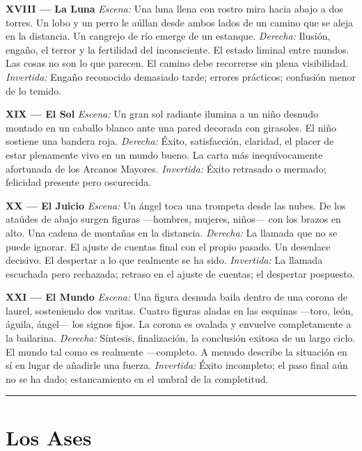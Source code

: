 \textbf{XVIII --- La Luna} \emph{Escena:} Una luna llena con rostro mira hacia abajo a dos torres. Un lobo y un perro le aúllan desde ambos lados de un camino que se aleja en la distancia. Un cangrejo de río emerge de un estanque. \emph{Derecha:} Ilusión, engaño, el terror y la fertilidad del inconsciente. El estado liminal entre mundos. Las cosas no son lo que parecen. El camino debe recorrerse sin plena visibilidad. \emph{Invertida:} Engaño reconocido demasiado tarde; errores prácticos; confusión menor de lo temido.

\textbf{XIX --- El Sol} \emph{Escena:} Un gran sol radiante ilumina a un niño desnudo montado en un caballo blanco ante una pared decorada con girasoles. El niño sostiene una bandera roja. \emph{Derecha:} Éxito, satisfacción, claridad, el placer de estar plenamente vivo en un mundo bueno. La carta más inequívocamente afortunada de los Arcanos Mayores. \emph{Invertida:} Éxito retrasado o mermado; felicidad presente pero oscurecida.

\textbf{XX --- El Juicio} \emph{Escena:} Un ángel toca una trompeta desde las nubes. De los ataúdes de abajo surgen figuras ---hombres, mujeres, niños--- con los brazos en alto. Una cadena de montañas en la distancia. \emph{Derecha:} La llamada que no se puede ignorar. El ajuste de cuentas final con el propio pasado. Un desenlace decisivo. El despertar a lo que realmente se ha sido. \emph{Invertida:} La llamada escuchada pero rechazada; retraso en el ajuste de cuentas; el despertar pospuesto.

\textbf{XXI --- El Mundo} \emph{Escena:} Una figura desnuda baila dentro de una corona de laurel, sosteniendo dos varitas. Cuatro figuras aladas en las esquinas ---toro, león, águila, ángel--- los signos fijos. La corona es ovalada y envuelve completamente a la bailarina. \emph{Derecha:} Síntesis, finalización, la conclusión exitosa de un largo ciclo. El mundo tal como es realmente ---completo. A menudo describe la situación en sí en lugar de añadirle una fuerza. \emph{Invertida:} Éxito incompleto; el paso final aún no se ha dado; estancamiento en el umbral de la completitud.

\begin{center}\rule{0.5\linewidth}{0.5pt}\end{center}

\section{Los Ases}\label{the-aces}

